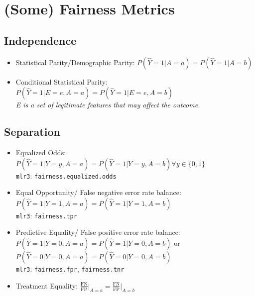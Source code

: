 \documentclass[11pt,a4paper]{article}
\begin{document}
\section{(Some) Fairness Metrics}

\subsection*{Independence}
\begin{itemize}[leftmargin=2em]
    \item Statistical Parity/Demographic Parity: $P(\hat{Y} = 1 | A = a) = P(\hat{Y} = 1 | A = b)$
    \item Conditional Statistical Parity: $P(\hat{Y} = 1 | E = e, A = a) = P(\hat{Y} = 1 | E = e, A = b)$ \\ \textit{E is a set of legitimate features that may affect the outcome.}
\end{itemize}

\subsection*{Separation}
\begin{itemize}[leftmargin=2em]
    \item Equalized Odds: $P(\hat{Y} = 1 | Y = y, A = a) = P(\hat{Y} = 1 | Y = y, A = b) \forall y \in \{0, 1\}$ \\ \texttt{mlr3}: \texttt{fairness.equalized.odds}
    \item Equal Opportunity/ False negative error rate balance: $P(\hat{Y} = 1 | Y = 1, A = a) = P(\hat{Y} = 1 | Y = 1, A = b)$ \\ \texttt{mlr3}: \texttt{fairness.tpr}
    \item Predictive Equality/ False positive error rate balance: $P(\hat{Y} = 1 | Y = 0, A = a) = P(\hat{Y} = 1 | Y = 0, A = b)$ or \\ $P(\hat{Y} = 0 | Y = 0, A = a) = P(\hat{Y} = 0 | Y = 0, A = b)$ \\ \texttt{mlr3}: \texttt{fairness.fpr}, \texttt{fairness.tnr}
    \item Treatment Equality: $\frac{\text{FN}}{\text{FP}} \big|_{A = a} = \frac{\text{FN}}{\text{FP}} \big|_{A = b}$
\end{itemize}
\end{document}
